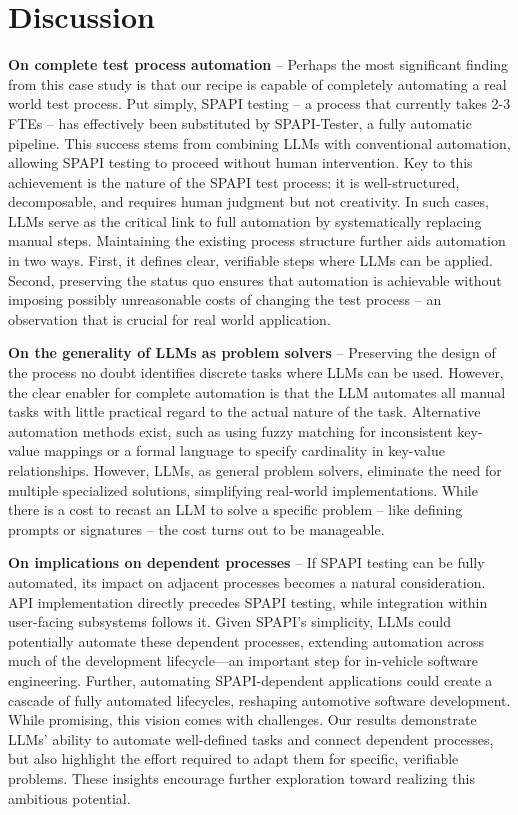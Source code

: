 \section{Discussion}

\noindent \textbf{On complete test process automation} -- Perhaps the most significant finding from this case study is that our recipe is capable of completely automating a real world test process. Put simply, SPAPI testing -- a process that currently takes 2-3 FTEs -- has effectively been substituted by SPAPI-Tester, a fully automatic pipeline. 
This success stems from combining LLMs with conventional automation, allowing SPAPI testing to proceed without human intervention. Key to this achievement is the nature of the SPAPI test process: it is well-structured, decomposable, and requires human judgment but not creativity. 
In such cases, LLMs serve as the critical link to full automation by systematically replacing manual steps. Maintaining the existing process structure further aids automation in two ways. First, it defines clear, verifiable steps where LLMs can be applied.
Second, preserving the status quo ensures that automation is achievable without imposing possibly unreasonable costs of changing the test process -- an observation that is crucial for real world application. 


\noindent \textbf{On the generality of LLMs as problem solvers} -- Preserving the design of the process no doubt identifies discrete tasks where LLMs can be used. However, the clear enabler for complete automation is that the LLM automates all manual tasks with little practical regard to the actual nature of the task. 
Alternative automation methods exist, such as using fuzzy matching for inconsistent key-value mappings or a formal language to specify cardinality in key-value relationships. However, LLMs, as general problem solvers, eliminate the need for multiple specialized solutions, simplifying real-world implementations. 
While there is a cost to recast an LLM to solve a specific problem -- like defining prompts or signatures -- the cost turns out to be manageable. 


\noindent \textbf{On implications on dependent processes} -- If SPAPI testing can be fully automated, its impact on adjacent processes becomes a natural consideration. API implementation directly precedes SPAPI testing, while integration within user-facing subsystems follows it. Given SPAPI’s simplicity, LLMs could potentially automate these dependent processes, extending automation across much of the development lifecycle—an important step for in-vehicle software engineering. Further, automating SPAPI-dependent applications could create a cascade of fully automated lifecycles, reshaping automotive software development.
While promising, this vision comes with challenges. Our results demonstrate LLMs’ ability to automate well-defined tasks and connect dependent processes, but also highlight the effort required to adapt them for specific, verifiable problems. These insights encourage further exploration toward realizing this ambitious potential. 


